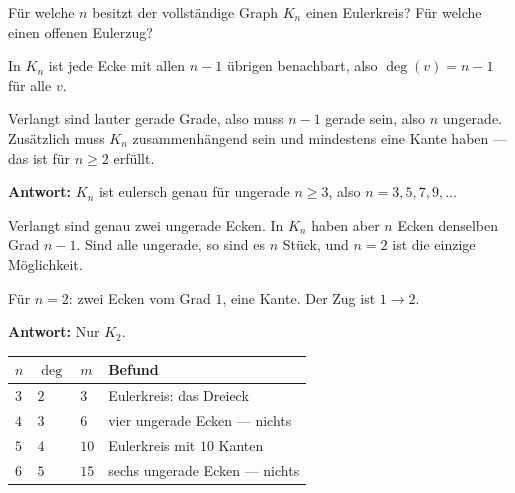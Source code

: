 \begin{aufgabe}
Für welche $n$ besitzt der vollständige Graph $K_n$ einen Eulerkreis? Für welche einen offenen Eulerzug?

\loesung
{}
In $K_n$ ist jede Ecke mit allen $n-1$ übrigen benachbart, also $\deg(v) = n-1$ für alle $v$.

Verlangt sind lauter gerade Grade, also muss $n-1$ gerade sein, also $n$ ungerade. Zusätzlich muss $K_n$ zusammenhängend sein und mindestens eine Kante haben --- das ist für $n \ge 2$ erfüllt.

\textbf{Antwort:} $K_n$ ist eulersch genau für ungerade $n \ge 3$, also $n = 3, 5, 7, 9, \ldots$

Verlangt sind genau zwei ungerade Ecken. In $K_n$ haben aber  $n$ Ecken denselben Grad $n-1$. Sind alle ungerade, so sind es $n$ Stück, und $n = 2$ ist die einzige Möglichkeit.

Für $n = 2$: zwei Ecken vom Grad $1$, eine Kante. Der Zug ist $1 \to 2$. \checkmark

\textbf{Antwort:} Nur $K_2$.

\begin{center}
\renewcommand{\arraystretch}{1.42}
\begin{tabular}{@{}P{1.2cm}P{1.6cm}P{1.6cm}P{3.0cm}@{}}
\toprule
$n$ & $\deg$ & $m$ & \textbf{Befund}\\
\midrule
$3$ & $2$ & $3$ & Eulerkreis: das Dreieck\\
$4$ & $3$ & $6$ & vier ungerade Ecken --- nichts\\
$5$ & $4$ & $10$ & Eulerkreis mit $10$ Kanten\\
$6$ & $5$ & $15$ & sechs ungerade Ecken --- nichts\\
\bottomrule
\end{tabular}
\end{center}
\end{aufgabe}

